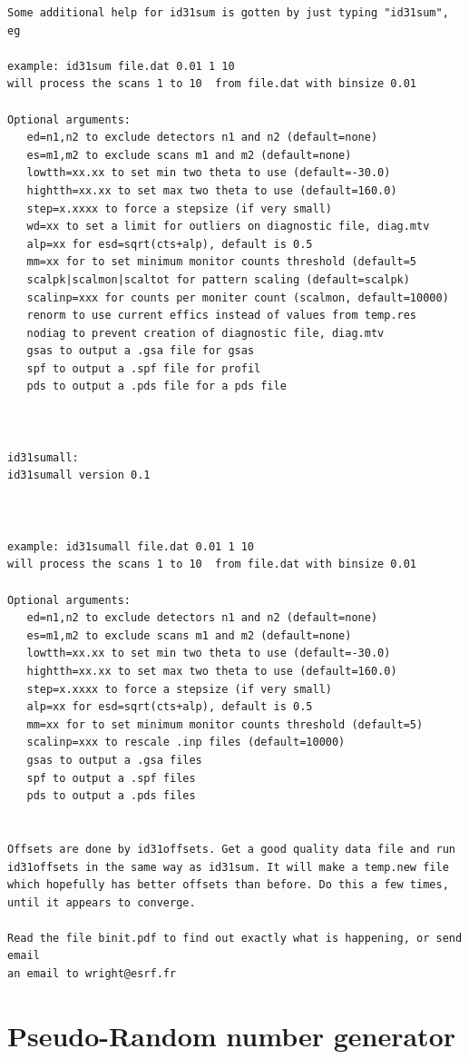 \documentclass[10pt,a4paper,notitlepage]{article}
\begin{document}
\begin{verbatim}
Some additional help for id31sum is gotten by just typing "id31sum", eg
 
example: id31sum file.dat 0.01 1 10
will process the scans 1 to 10  from file.dat with binsize 0.01

Optional arguments:
   ed=n1,n2 to exclude detectors n1 and n2 (default=none)
   es=m1,m2 to exclude scans m1 and m2 (default=none)
   lowtth=xx.xx to set min two theta to use (default=-30.0)
   hightth=xx.xx to set max two theta to use (default=160.0)
   step=x.xxxx to force a stepsize (if very small)
   wd=xx to set a limit for outliers on diagnostic file, diag.mtv
   alp=xx for esd=sqrt(cts+alp), default is 0.5
   mm=xx for to set minimum monitor counts threshold (default=5
   scalpk|scalmon|scaltot for pattern scaling (default=scalpk)
   scalinp=xxx for counts per moniter count (scalmon, default=10000)
   renorm to use current effics instead of values from temp.res
   nodiag to prevent creation of diagnostic file, diag.mtv
   gsas to output a .gsa file for gsas
   spf to output a .spf file for profil
   pds to output a .pds file for a pds file



id31sumall:
id31sumall version 0.1


 
example: id31sumall file.dat 0.01 1 10
will process the scans 1 to 10  from file.dat with binsize 0.01

Optional arguments:
   ed=n1,n2 to exclude detectors n1 and n2 (default=none)
   es=m1,m2 to exclude scans m1 and m2 (default=none)
   lowtth=xx.xx to set min two theta to use (default=-30.0)
   hightth=xx.xx to set max two theta to use (default=160.0)
   step=x.xxxx to force a stepsize (if very small)
   alp=xx for esd=sqrt(cts+alp), default is 0.5
   mm=xx for to set minimum monitor counts threshold (default=5)
   scalinp=xxx to rescale .inp files (default=10000)
   gsas to output a .gsa files
   spf to output a .spf files
   pds to output a .pds files


Offsets are done by id31offsets. Get a good quality data file and run 
id31offsets in the same way as id31sum. It will make a temp.new file
which hopefully has better offsets than before. Do this a few times,
until it appears to converge.

Read the file binit.pdf to find out exactly what is happening, or send email
an email to wright@esrf.fr

\end{verbatim}

\section{Pseudo-Random number generator}
\end{document}
